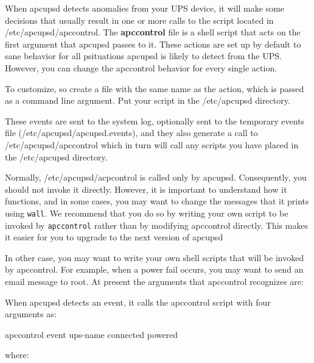 \label{index-Event-handling-150}
\label{index-Customizing-event-handling-151}

When apcupsd detects anomalies from your UPS device, it will make some
decisions that usually result in one or more calls to the script located in
/etc/apcupsd/apccontrol. The {\bf apccontrol} file is a shell script that acts
on the first argument that apcupsd passes to it. These actions are set up by
default to sane behavior for all psituations apcupsd is likely to detect from
the UPS. However, you can change the apccontrol behavior for every single
action.  

To customize, so create a file with the same name as the action, which is
passed as a command line argument. Put your script in the /etc/apcupsd
directory.  

These events are sent to the system log, optionally sent to the temporary
events file (/etc/apcupsd/apcupsd.events), and they also generate a call to
/etc/apcupsd/apccontrol which in turn will call any scripts you have placed in
the /etc/apcupsd directory.  

Normally, /etc/apcupsd/acpcontrol is called only by apcupsd. Consequently, you
should not invoke it directly.  However, it is important to understand how it
functions, and in some cases, you may want to change the messages that it
prints using {\tt wall}. We recommend that you do so by writing your own
script to be invoked by {\tt apccontrol} rather than by modifying apccontrol
directly. This makes it easier for you to upgrade to the next version of
apcupsd  

In other case, you may want to write your own shell scripts that will be
invoked by apccontrol. For example, when a power fail occurs, you may want to
send an email message to root. At present the arguments that apccontrol
recognizes are:  

When apcupsd detects an event, it calls the apccontrol script with four
arguments as:  

apccontrol \lt{}event\gt{} \lt{}ups-name\gt{} \lt{}connected\gt{}
\lt{}powered\gt{}  

where:  

